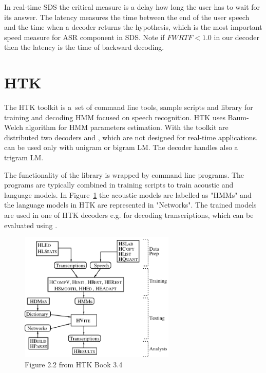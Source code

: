 {
In real-time \ac{SDS} the critical measure is a delay how long the user has to wait for its answer.
The latency measures the time between the end of the user speech and the time when a decoder returns the hypothesis, which is the most important speed measure for \ac{ASR} component in \ac{SDS}.
Note if $FWRTF < 1.0 $ in our decoder then the latency is the time of backward decoding.


\section{\ac{HTK}}
\label{sec:back_htk}
The \ac{HTK} toolkit is a~set of command line tools, sample scripts and library for training and decoding \ac{HMM} focused on speech recognition.
\ac{HTK} uses Baum-Welch algorithm for \ac{HMM} parameters estimation.
With the toolkit are distributed two decoders  and , which are not designed for real-time applications.
 can be used only with unigram or bigram \ac{LM}.
The  decoder handles also a trigram \ac{LM}.

The functionality of the library is wrapped by command line programs.
The programs are typically combined in training scripts to train acoustic and language models.
In Figure~\ref{fig:htk_tools} the acoustic models are labelled as "HMMs" 
and the language models in \ac{HTK} are represented in "Networks".
The trained models are used in one of \ac{HTK} decoders e.g.  for decoding transcriptions, which can be evaluated using .

\begin{figure}[!htp]
    \begin{center}
    \includegraphics[width=20em]{images/htk_tools.ps}
    \caption{Figure 2.2 from HTK Book 3.4\cite{young2006htk}}
    \label{fig:htk_tools} 
    \end{center}
\end{figure}

}
